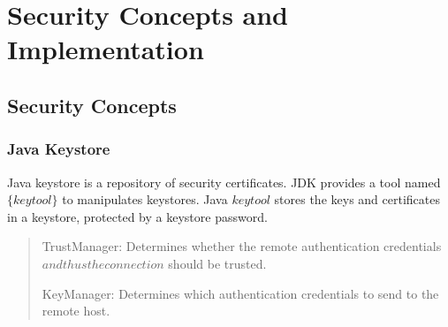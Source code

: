 \documentclass[11pt, oneside]{article}   	%
\begin{document}
\pagebreak

\section{\color{DarkOrange}Security Concepts and Implementation}
\subsection{\color{DarkBlue} Security Concepts}
\subsubsection{\color{DeepPink4}Java Keystore}


Java keystore is a repository of security certificates.
JDK provides a tool named $\{keytool\}$ to manipulates keystores. Java $keytool$ stores the keys and certificates in a keystore, protected by a keystore password.

\begin{quote}
TrustManager: Determines whether the remote authentication credentials \(and thus the connection\) should be trusted.

KeyManager: Determines which authentication credentials to send to the remote host.
\end{quote}
\end{document}
